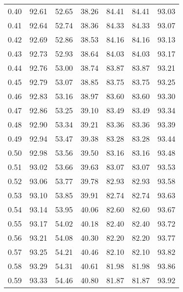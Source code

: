 \begin{tabular}{|c|c|c|c|c|c|c|}
      0.40 &     92.61 &     52.65 &      38.26 &   84.41 &      84.41 &         93.03 \\
      0.41 &     92.64 &     52.74 &      38.36 &   84.33 &      84.33 &         93.07 \\
      0.42 &     92.69 &     52.86 &      38.53 &   84.16 &      84.16 &         93.13 \\
      0.43 &     92.73 &     52.93 &      38.64 &   84.03 &      84.03 &         93.17 \\
      0.44 &     92.76 &     53.00 &      38.74 &   83.87 &      83.87 &         93.21 \\
      0.45 &     92.79 &     53.07 &      38.85 &   83.75 &      83.75 &         93.25 \\
      0.46 &     92.83 &     53.16 &      38.97 &   83.60 &      83.60 &         93.30 \\
      0.47 &     92.86 &     53.25 &      39.10 &   83.49 &      83.49 &         93.34 \\
      0.48 &     92.90 &     53.34 &      39.21 &   83.36 &      83.36 &         93.39 \\
      0.49 &     92.94 &     53.47 &      39.38 &   83.28 &      83.28 &         93.44 \\
      0.50 &     92.98 &     53.56 &      39.50 &   83.16 &      83.16 &         93.48 \\
      0.51 &     93.02 &     53.66 &      39.63 &   83.07 &      83.07 &         93.53 \\
      0.52 &     93.06 &     53.77 &      39.78 &   82.93 &      82.93 &         93.58 \\
      0.53 &     93.10 &     53.85 &      39.91 &   82.74 &      82.74 &         93.63 \\
      0.54 &     93.14 &     53.95 &      40.06 &   82.60 &      82.60 &         93.67 \\
      0.55 &     93.17 &     54.02 &      40.18 &   82.40 &      82.40 &         93.72 \\
      0.56 &     93.21 &     54.08 &      40.30 &   82.20 &      82.20 &         93.77 \\
      0.57 &     93.25 &     54.21 &      40.46 &   82.10 &      82.10 &         93.82 \\
      0.58 &     93.29 &     54.31 &      40.61 &   81.98 &      81.98 &         93.86 \\
      0.59 &     93.33 &     54.46 &      40.80 &   81.87 &      81.87 &         93.92 \\

\end{tabular}
